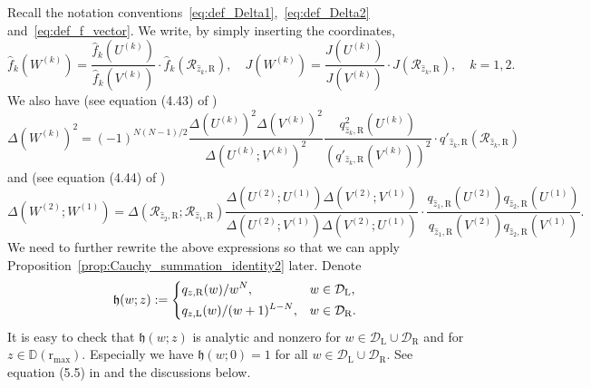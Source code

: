 \documentclass{article}
\numberwithin{equation}{section}
\newcommand{\LL}{\mathrm{L}}
\newcommand{\RR}{\mathrm{R}}
\newcommand{\rr}{\mathrm{r_{max}}}
\begin{document}
Recall the notation conventions~\eqref{eq:def_Delta1},~\eqref{eq:def_Delta2} and~\eqref{eq:def_f_vector}. We write, by simply inserting the coordinates,
\begin{equation*}
	\hat f_k\left(W^{(k)}\right) = \frac{\hat f_k\left(U^{(k)}\right)}{\hat f_k\left(V^{(k)}\right)} \cdot \hat f_k\left(\mathcal{R}_{\hat z_k,\RR}\right),
	\quad 
	J\left(W^{(k)}\right) = \frac{J\left(U^{(k)}\right)}{J\left(V^{(k)}\right)} \cdot  J\left(\mathcal{R}_{\hat z_k,\RR}\right), \quad k=1,2.
\end{equation*}
We also have (see equation (4.43) of \cite{Baik-Liu17})
\begin{equation*}
	\Delta\left(W^{(k)}\right)^2 = (-1)^{N(N-1)/2} 
	                    \frac{\Delta\left(U^{(k)}\right)^2\Delta\left(V^{(k)}\right)^2}
	                         {\Delta\left(U^{(k)};V^{(k)}\right)^2}
	                    \frac{q_{\hat z_k,\RR}^2\left(U^{(k)}\right)}
	                         {\left(q'_{\hat z_k,\RR}\left(V^{(k)}\right)\right)^2}
	                    \cdot q'_{\hat z_k,\RR}\left(\mathcal{R}_{\hat z_k,\RR}\right)
\end{equation*}
and (see equation (4.44) of \cite{Baik-Liu17})
\begin{equation*}
	\Delta\left(W^{(2)};W^{(1)}\right)=\Delta\left(\mathcal{R}_{\hat z_2,\RR};\mathcal{R}_{\hat z_1,\RR}\right)
	\frac{\Delta\left(U^{(2)};U^{(1)}\right)\Delta\left(V^{(2)};V^{(1)}\right)}{\Delta\left(U^{(2)};V^{(1)}\right)\Delta\left(V^{(2)};U^{(1)}\right)}
	\cdot
	\frac{q_{\hat z_1,\RR}\left(U^{(2)}\right)
	q_{\hat z_2,\RR}\left(U^{(1)}\right)}{
q_{\hat z_1,\RR}\left(V^{(2)}\right)
q_{\hat z_2,\RR}\left(V^{(1)}\right)}.
\end{equation*}
We need to further rewrite the above expressions so that we can apply Proposition~\ref{prop:Cauchy_summation_identity2} later.
Denote
\begin{equation*}
	\mathfrak{h}(w;z):= \begin{dcases}
		q_{z,\RR}(w)/w^N, & w\in \mathcal{D}_\LL,\\
		q_{z,\LL}(w)/(w+1)^{L-N}, & w\in\mathcal{D}_\RR.
	\end{dcases}
\end{equation*}
It is easy to check that $\mathfrak{h}(w;z)$ is analytic and nonzero for $w\in\mathcal{D}_\LL\cup\mathcal{D}_\RR$ and for $z\in\mathbb{D}(\rr)$. Especially we have $\mathfrak{h}(w;0)=1$ for all $w\in\mathcal{D}_\LL\cup\mathcal{D}_\RR$. See equation (5.5) in \cite{Liu19} and the discussions below.
\end{document}
